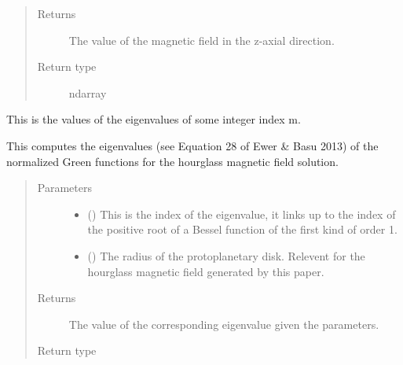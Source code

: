 \documentclass[letterpaper,10pt,english]{sphinxmanual}
\begin{document}
\begin{fulllineitems}
\begin{quote}
\begin{description}
\begin{itemize}
\end{itemize}

\item[{Returns}] \leavevmode
{} \textendash{} The value of the magnetic field in the z-axial direction.

\item[{Return type}] \leavevmode
ndarray

\end{description}\end{quote}

\end{fulllineitems}


\begin{fulllineitems}
\label{\detokenize{Backend.Ewertowski_Basu_2013:Backend.Ewertowski_Basu_2013.Ewer_Basu__eigenvalues}}
This is the values of the eigenvalues of some integer index m.

This computes the eigenvalues (see Equation 28 of Ewer \& Basu 2013) of
the normalized Green functions for the hourglass magnetic field solution.
\begin{quote}\begin{description}
\item[{Parameters}] \leavevmode\begin{itemize}
\item {} 
 () \textendash{} This is the index of the eigenvalue, it links up to the index of the
positive root of a Bessel function of the first kind of order 1.

\item {} 
 () \textendash{} The radius of the protoplanetary disk. Relevent for the hourglass
magnetic field generated by this paper.

\end{itemize}

\item[{Returns}] \leavevmode
{} \textendash{} The value of the corresponding eigenvalue given the parameters.

\item[{Return type}] \leavevmode
{}

\end{description}\end{quote}

\end{fulllineitems}
\end{document}
